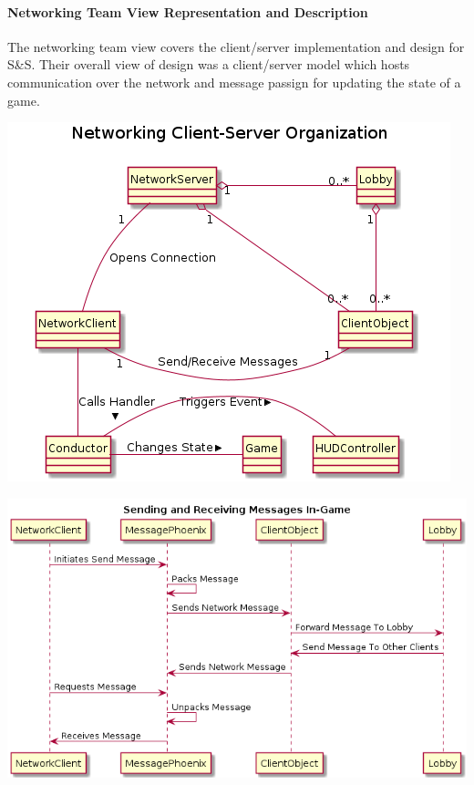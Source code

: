 \documentclass[12pt,a4paper,titlepage]{article}
\begin{document}
\paragraph{Networking Team View Representation and Description}
The networking team view covers the client/server implementation and design for S\&S. Their overall view of design was a client/server model which hosts communication over the network and message passign for updating the state of a game. 
\begin{center}
\includegraphics[width=\linewidth]{networkUML.png}
\end{center}

\begin{center}
\includegraphics[width=\linewidth]{messageUML.png}
\end{center}
\end{document}
